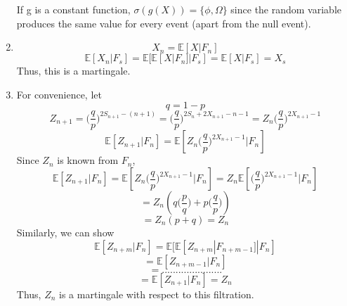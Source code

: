 \documentclass[a4paper,11pt]{article}
\begin{document}
\begin{enumerate}
If g is a constant function, $\sigma(g(X))= \{\phi,\Omega\}$ since the random variable produces the same value for every event (apart from the null event).

\item 
\[X_n =\mathbb{E}[X|F_n]\]
\[\mathbb{E}[X_n|F_s] =\mathbb{E}[\mathbb{E}[X|F_n]|F_s]=\mathbb{E}[X|F_s]= X_s\]
Thus, this is a martingale.
\item
For convenience, let
\[ q= 1-p\]
\[Z_{n+1} = \bigg(\frac{q}{p}\bigg)^{2 S_{n+1}-(n+1)}= \bigg(\frac{q}{p}\bigg)^{2 S_{n}+2X_{n+1}-n-1}=Z_n\bigg(\frac{q}{p}\bigg)^{2X_{n+1}-1} \]
\[\mathbb{E}[Z_{n+1}|F_{n}]=\mathbb{E}[Z_n\bigg(\frac{q}{p}\bigg)^{2X_{n+1}-1}|F_{n}]\]
Since $Z_n$ is known from $F_n$,
\[\mathbb{E}[Z_{n+1}|F_{n}]=\mathbb{E}[Z_n\bigg(\frac{q}{p}\bigg)^{2X_{n+1}-1}|F_{n}] = Z_n \mathbb{E}[\bigg(\frac{q}{p}\bigg)^{2X_{n+1}-1}|F_{n}]\]
\[= Z_n (q \bigg( \frac{p}{q} \bigg)+ p \bigg(\frac{q}{p} \bigg))\]
\[=Z_n(p+q)=Z_n\]
Similarly, we can show
\[\mathbb{E}[Z_{n+m}|F_{n}]=\mathbb{E}[\mathbb{E}[Z_{n+m}|F_{n+m-1}]|F_{n}] \]
\[=\mathbb{E}[Z_{n+m-1}|F_{n}] \]
\[= ......................\]
\[=\mathbb{E}[Z_{n+1}|F_{n}] = Z_n\]
Thus, $Z_n$ is a martingale with respect to this filtration.
\end{enumerate} 
	
\end{document}
